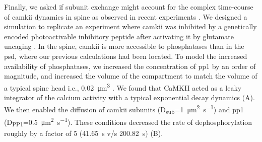 \documentclass[9pt,lineno]{elife}
\newcommand\SUB[2]{#1\textsubscript{#2}}
\begin{document}
Finally, we asked if subunit exchange might account for the complex time-course
of \gls{camkii} dynamics in spine as observed in recent experiments
\citep{chang_camkii_2017}. We designed a simulation to replicate an experiment
where \gls{camkii} was inhibited by a genetically encoded photoactivable
inhibitory peptide after activating it by glutamate uncaging
\citep{murakoshi_kinetics_2017}. In the spine, \gls{camkii} is more accessible
to phosphatases than in the \gls{psd}, where our previous calculations had been
located. To model the increased availability of phosphatases, we increased the
concentration of \gls{pp1} by an order of magnitude, and increased the volume of
the compartment to match the volume of a typical spine head i.e.,
\SI{0.02}{\cubic\micro\meter} \citep{bartol_nanoconnectomic_2015}. We found that
CaMKII acted as a leaky integrator of the calcium activity with a typical
exponential decay dynamics (A). We then enabled the
diffusion of \gls{camkii} subunits
(\SUB{D}{sub}=\SI{1}{\micro\meter\squared\per\second}) and \gls{pp1}
(\SUB{D}{PP1}=\SI{0.5}{\micro\meter\squared\per\second}). These conditions
decreased the rate of dephosphorylation roughly by a factor of 5
(\SI{41.65}{\second} v/s \SI{200.82}{\second}) (B). 
\end{document}
